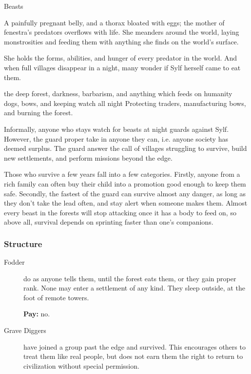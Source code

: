 \begin{multicols}{2}

  {\textxswdown}%
  {Beasts}%
  {%
    A painfully pregnant belly, and a thorax bloated with eggs; the mother of \gls{fenestra}'s predators overflows with life.
    She meanders around the world, laying monstrosities and feeding them with anything she finds on the world's surface.

    She holds the forms, abilities, and hunger of every predator in the world.
    And when full villages disappear in a night, many wonder if Sylf herself came to eat them.
  }%
  {the deep forest, darkness, barbarism, and anything which feeds on humanity}%
  {dogs, bows, and keeping watch all night}%
  {}%
  {
    Protecting traders, manufacturing bows, and burning the forest.
  }%

Informally, anyone who stays watch for beasts at night guards against Sylf.
However, the \gls{guard} proper take in anyone they can, i.e. anyone society has deemed surplus.
The \gls{guard} answer the call of villages struggling to survive, build new settlements, and perform missions beyond the \gls{edge}.

Those who survive a few years fall into a few categories.
Firstly, anyone from a rich family can often buy their child into a promotion good enough to keep them safe.
Secondly, the fastest of the \gls{guard} can survive almost any danger, as long as they don't take the lead often, and stay alert when someone makes them.
Almost every beast in the forests will stop attacking once it has a body to feed on, so above all, survival depends on sprinting faster than one's companions.

\subsubsection{Structure}

\begin{description}
  \item[Fodder]
  \label{fodder}%
  do as anyone tells them, until the forest eats them, or they gain proper rank.
  None may enter a settlement of any kind.
  They sleep outside, at the foot of remote towers.

  \textbf{Pay:} no.

  \item[Grave Diggers]
  have joined a group past the \gls{edge} and survived.
  This encourages others to treat them like real people, but does not earn them the right to return to civilization without special permission.


\end{description}
\end{multicols}
